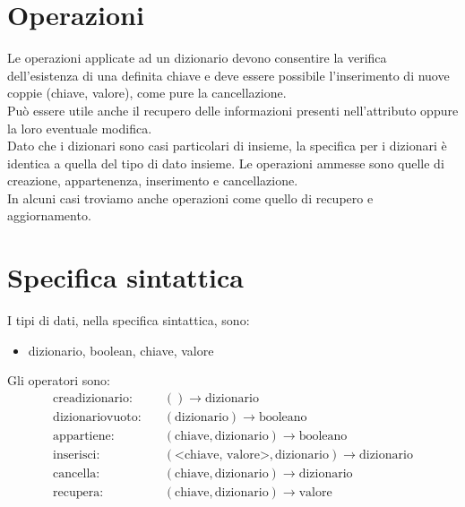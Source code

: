 \documentclass[12pt]{report}
\begin{document}
	\section{Operazioni}
	Le operazioni applicate ad un dizionario devono consentire la verifica dell'esistenza di una definita chiave e deve essere possibile l'inserimento di nuove coppie (chiave, valore), come pure la cancellazione. \\
	Può essere utile anche il recupero delle informazioni presenti nell'attributo oppure la loro eventuale modifica. \\
	Dato che i dizionari sono casi particolari di insieme, la specifica per i dizionari è identica a quella del tipo di dato insieme. Le operazioni ammesse sono quelle di creazione, appartenenza, inserimento e cancellazione. \\
	In alcuni casi troviamo anche operazioni come quello di recupero e aggiornamento.
	\section{Specifica sintattica}
	I tipi di dati, nella specifica sintattica, sono:
	\begin{itemize}
		\item dizionario, boolean, chiave, valore
	\end{itemize}
	Gli operatori sono:
	\begin{align*}
		\text{creadizionario:} &\quad () \to \text{dizionario} \\
		\text{dizionariovuoto:} &\quad (\text{dizionario}) \to \text{booleano} \\
		\text{appartiene:} &\quad (\text{chiave}, \text{dizionario}) \to \text{booleano} \\
		\text{inserisci:} &\quad (\text{<chiave, valore>}, \text{dizionario}) \to \text{dizionario} \\
		\text{cancella:} &\quad (\text{chiave}, \text{dizionario}) \to \text{dizionario} \\
		\text{recupera:} &\quad (\text{chiave}, \text{dizionario}) \to \text{valore}
	\end{align*}
\end{document}
